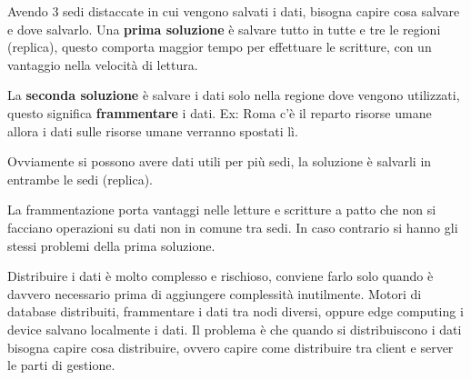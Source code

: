 Avendo $3$ sedi distaccate in cui vengono salvati i dati, bisogna capire cosa salvare
e dove salvarlo.
Una \textbf{prima soluzione} è salvare tutto in tutte e tre le regioni (replica), 
questo comporta maggior tempo per effettuare le scritture, con un vantaggio nella 
velocità di lettura.

La \textbf{seconda soluzione} è salvare i dati solo nella regione dove vengono 
utilizzati, questo significa \textbf{frammentare} i dati. Ex: Roma c'è il
reparto risorse umane allora i dati sulle risorse umane verranno spostati lì.

Ovviamente si possono avere dati utili per più sedi, la soluzione è salvarli in
entrambe le sedi (replica).
\begin{nota}
    La frammentazione porta vantaggi nelle letture e scritture a patto che non
    si facciano operazioni su dati non in comune tra sedi. In caso contrario si
    hanno gli stessi problemi della prima soluzione.
\end{nota}
\begin{nota}
    Distribuire i dati è molto complesso e rischioso, conviene farlo solo quando 
    è davvero necessario prima di aggiungere complessità inutilmente. Motori di 
    database distribuiti, frammentare i dati tra nodi diversi, oppure edge 
    computing i device salvano localmente i dati. Il problema è che quando si 
    distribuiscono i dati bisogna capire cosa distribuire, ovvero capire come 
    distribuire tra client e server le parti di gestione.
\end{nota}
